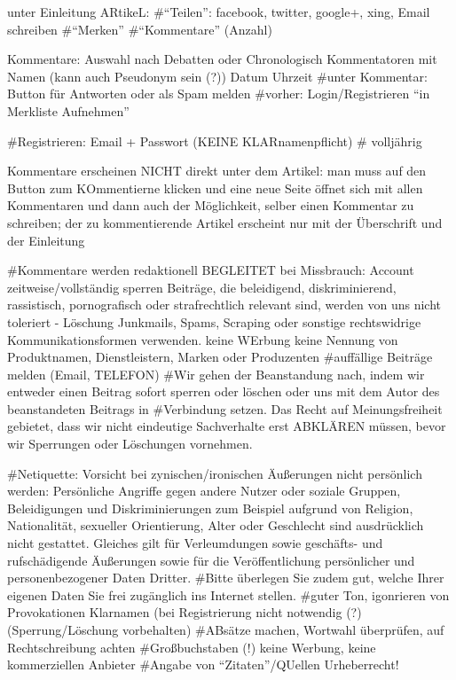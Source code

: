 unter Einleitung ARtikeL: 
	#``Teilen'': facebook, twitter, google+, xing, Email schreiben
	#``Merken''
	#``Kommentare'' (Anzahl)
	
Kommentare: Auswahl nach Debatten oder Chronologisch
	Kommentatoren mit Namen (kann auch Pseudonym sein (?)) Datum Uhrzeit
	#unter Kommentar: Button für Antworten oder als Spam melden
	#vorher: Login/Registrieren
	``in Merkliste Aufnehmen''
	
#Registrieren: Email + Passwort (KEINE KLARnamenpflicht)
#	volljährig




Kommentare erscheinen NICHT direkt unter dem Artikel: man muss auf den Button zum KOmmentierne klicken und eine neue Seite öffnet sich mit allen Kommentaren und dann auch der Möglichkeit, selber einen Kommentar zu schreiben; der zu kommentierende Artikel erscheint nur mit der Überschrift und der Einleitung


#Kommentare werden redaktionell BEGLEITET
bei Missbrauch: Account zeitweise/vollständig sperren
Beiträge, die beleidigend, diskriminierend, rassistisch, pornografisch oder strafrechtlich relevant sind, werden von uns nicht toleriert - Löschung
Junkmails, Spams, Scraping oder sonstige rechtswidrige Kommunikationsformen verwenden. 
keine WErbung
keine Nennung von Produktnamen, Dienstleistern, Marken oder Produzenten 
#auffällige Beiträge melden (Email, TELEFON)
#Wir gehen der Beanstandung nach, indem wir entweder einen Beitrag sofort sperren oder löschen oder uns mit dem Autor des beanstandeten Beitrags in #Verbindung setzen. Das Recht auf Meinungsfreiheit gebietet, dass wir nicht eindeutige Sachverhalte erst ABKLÄREN müssen, bevor wir Sperrungen oder Löschungen vornehmen.

#Netiquette:
	Vorsicht bei zynischen/ironischen Äußerungen
	nicht persönlich werden: Persönliche Angriffe gegen andere Nutzer oder soziale Gruppen, Beleidigungen und Diskriminierungen zum Beispiel aufgrund von Religion, Nationalität, sexueller Orientierung, Alter oder Geschlecht sind ausdrücklich nicht gestattet. Gleiches gilt für Verleumdungen sowie geschäfts- und rufschädigende Äußerungen sowie für die Veröffentlichung persönlicher und personenbezogener Daten Dritter. #Bitte überlegen Sie zudem gut, welche Ihrer eigenen Daten Sie frei zugänglich ins Internet stellen.
	#guter Ton, igonrieren von Provokationen
	Klarnamen (bei Registrierung nicht notwendig (?) (Sperrung/Löschung vorbehalten)
	#ABsätze machen, Wortwahl überprüfen, auf Rechtschreibung achten
	#Großbuchstaben (!)
	keine Werbung, keine kommerziellen Anbieter
	#Angabe von ``Zitaten''/QUellen
	Urheberrecht!
	
